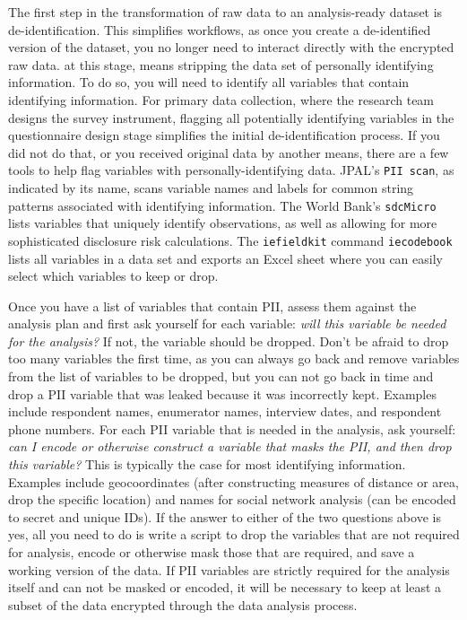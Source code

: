 The first step in the transformation of raw data to an analysis-ready dataset is de-identification.
This simplifies workflows, as once you create a de-identified version of the dataset, 
you no longer need to interact directly with the encrypted raw data. 
at this stage, means stripping the data set of personally identifying information.
To do so, you will need to identify all variables that contain 
identifying information.
For primary data collection, where the research team designs the survey instrument,
flagging all potentially identifying variables in the questionnaire design stage
simplifies the initial de-identification process.
If you did not do that, or you received original data by another means,
there are a few tools to help flag variables with personally-identifying data. 
JPAL's \texttt{PII scan}, as indicated by its name,
scans variable names and labels for common string patterns associated with identifying information.
The World Bank's \texttt{sdcMicro}
lists variables that uniquely identify observations,
as well as allowing for more sophisticated disclosure risk calculations.
The \texttt{iefieldkit} command \texttt{iecodebook}
lists all variables in a data set and exports an Excel sheet
where you can easily select which variables to keep or drop.

Once you have a list of variables that contain PII,
assess them against the analysis plan and first ask yourself for each variable:
\textit{will this variable be needed for the analysis?}
If not, the variable should be dropped.
Don't be afraid to drop too many variables the first time,
as you can always go back and remove variables from the list of variables to be dropped,
but you can not go back in time and drop a PII variable that was leaked
because it was incorrectly kept.
Examples include respondent names, enumerator names, interview dates, and respondent phone numbers.
For each PII variable that is needed in the analysis, ask yourself:
\textit{can I encode or otherwise construct a variable that masks the PII, and
then drop this variable?}
This is typically the case for most identifying information.
Examples include geocoordinates
(after constructing measures of distance or area,
drop the specific location)
and names for social network analysis (can be encoded to secret and unique IDs).
If the answer to either of the two questions above is yes,
all you need to do is write a script to drop the variables that are not required for analysis,
encode or otherwise mask those that are required,
and save a working version of the data.
If PII variables are strictly required for the analysis itself and can not be
masked or encoded,
it will be necessary to keep at least a subset of the data encrypted through
the data analysis process.

